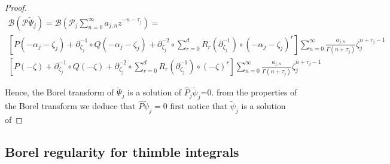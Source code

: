 \documentclass{article}
\theoremstyle{definition}
\newcommand{\series}[1]{\tilde{#1}}
\newcommand{\borel}{\mathcal{B}}
\begin{document}
\begin{proof}
\begin{multline*}
\borel\left(\mathcal{P}\series{\Psi}_j\right)=\borel\left(\mathcal{P}_j\sum_{n=0}^{\infty}a_{j,n}z^{-n-\tau_j}\right)=\\
\left[P(-\alpha_j-\zeta_j)+\partial_{\zeta_j}^{-1}\circ Q(-\alpha_j-\zeta_j)+\partial_{\zeta_j}^{-2}\circ \sum_{r=0}^dR_r(\partial_{\zeta_j}^{-1})\circ (-\alpha_j-\zeta_j)^r\right]\sum_{n=0}^{\infty}\frac{a_{j,n}}{\Gamma(n+\tau_j)}\zeta_j^{n+\tau_j-1}\\
\left[P(-\zeta)+\partial_{\zeta_j}^{-1}\circ Q(-\zeta)+\partial_{\zeta_j}^{-2}\circ \sum_{r=0}^dR_r(\partial_{\zeta_j}^{-1})\circ (-\zeta)^r\right]\sum_{n=0}^{\infty}\frac{a_{j,n}}{\Gamma(n+\tau_j)}\zeta_j^{n+\tau_j-1}
\end{multline*}
%

Hence, the Borel transform of $\series{\Psi}_j$ is a solution of $\hat{P}_j\series{\psi}_j$=0.  from the properties of the Borel transform we deduce that $\hat{P}\series{\psi}_j=0$ first notice that $\series{\psi}_j$ is a solution of 
\color{black}
\end{proof}

\subsection{Borel regularity for thimble integrals}
\end{document}
